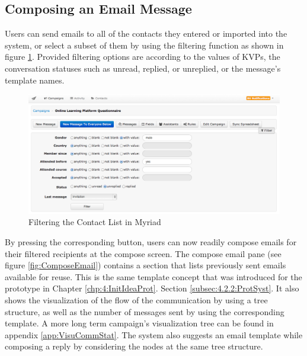 \clearpage

\subsection{Composing an Email Message}
\label{subsec:5.2.4:CompEmaiMess}

Users can send emails to all of the contacts they entered or imported into the system, or select a subset of them by using the filtering function as shown in figure \ref{fig:ContactFilters}. Provided filtering options are according to the values of \ac{KVP}s, the conversation statuses such as unread, replied, or unreplied, or the message's template names.

\begin{figure}[htbp]
	\centering
	\includegraphics[width=1.00\textwidth]{imgs/ContactFilters.png}
	\caption[Filtering the Contact List in Myriad]{Filtering the Contact List in Myriad}
	\label{fig:ContactFilters}
\end{figure}

By pressing the corresponding button, users can now readily compose emails for their filtered recipients at the compose screen. The compose email pane (see figure \ref{fig:ComposeEmail}) contains a section that lists previously sent emails available for reuse. This is the same template concept that was introduced for the prototype in Chapter \ref{chp:4:InitIdeaProt}. Section \ref{subsec:4.2.2:ProtSyst}. It also shows the visualization of the flow of the communication by using a tree structure, as well as the number of messages sent by using the corresponding template. A more long term campaign's visualization tree can be found in appendix \ref{app:VisuCommStat}. The system also suggests an email template while composing a reply by considering the nodes at the same tree structure.

